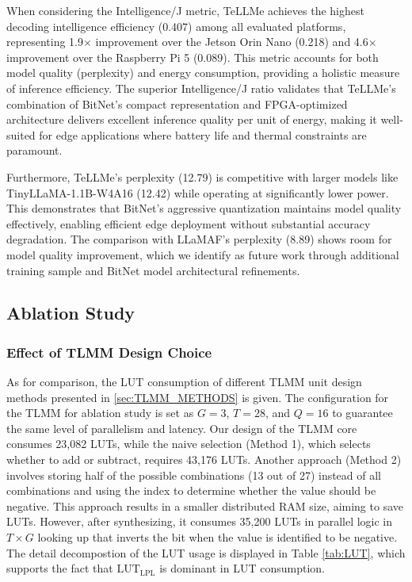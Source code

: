\documentclass[sigconf]{acmart}
\begin{document}
When considering the Intelligence/J metric, TeLLMe achieves the highest decoding intelligence efficiency (0.407) among all evaluated platforms, representing 1.9$\times$ improvement over the Jetson Orin Nano (0.218) and 4.6$\times$ improvement over the Raspberry Pi 5 (0.089). This metric accounts for both model quality (perplexity) and energy consumption, providing a holistic measure of inference efficiency. The superior Intelligence/J ratio validates that TeLLMe's combination of BitNet's compact representation and FPGA-optimized architecture delivers excellent inference quality per unit of energy, making it well-suited for edge applications where battery life and thermal constraints are paramount.

Furthermore, TeLLMe's perplexity (12.79) is competitive with larger models like TinyLLaMA-1.1B-W4A16 (12.42) while operating at significantly lower power. This demonstrates that BitNet's aggressive quantization maintains model quality effectively, enabling efficient edge deployment without substantial accuracy degradation. The comparison with LLaMAF's perplexity (8.89) shows room for model quality improvement, which we identify as future work through additional training sample and BitNet model architectural refinements.

\subsection{Ablation Study}
\subsubsection{Effect of TLMM Design Choice}\label{SEC:ABLATION_TLMM}
As for comparison, the LUT consumption of different TLMM unit design methods presented in \ref{sec:TLMM_METHODS} is given. The configuration for the TLMM for ablation study is set as \( G = 3 \), \( T = 28 \), and \( Q = 16 \) to guarantee the same level of parallelism and latency. Our design of the TLMM core consumes 23,082 LUTs, while the naive selection (Method 1), which selects whether to add or subtract, requires 43,176 LUTs. Another approach (Method 2) involves storing half of the possible combinations (13 out of 27) instead of all combinations and using the index to determine whether the value should be negative. This approach results in a smaller distributed RAM size, aiming to save LUTs. However, after synthesizing, it consumes 35,200 LUTs in parallel logic in $T\times G$ looking up that inverts the bit when the value is identified to be negative. The detail decompostion of the LUT usage is displayed in Table \ref{tab:LUT}, which supports the fact that $\text{LUT}_{\text{LPL}}$ is dominant in LUT consumption.
\end{document}
